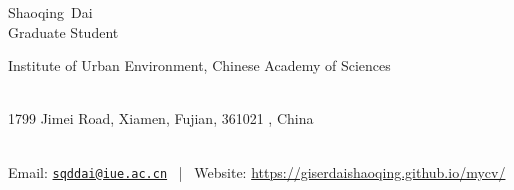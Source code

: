 \documentclass[11pt, a4paper]{article}
\makeatletter
\newcommand{\FirstName}{Shaoqing}
\newcommand{\LastName}{Dai}
\newcommand{\MyName}{\FirstName\ \LastName}
\newcommand{\MyRole}{Graduate Student}
\newcommand{\Email}{sqddai@iue.ac.cn}
\newcommand{\Website}{https://giserdaishaoqing.github.io/mycv/}
\newcommand{\Affiliation}{
    Institute of Urban Environment,
    Chinese Academy of Sciences
}
\newcommand{\Address}{
    1799 Jimei Road, Xiamen, Fujian, 361021 , China
}
\newcommand{\makefield}[2]{\makebox[1.5em]{\color{MarkerColour!80!black}#1} #2}
\makeatother
\begin{document}
\thispagestyle{empty}

\begin{center}
    {\fontsize{36pt}{0}\selectfont \MyName}
    \\[0.5cm]
    {\fontsize{16pt}{0}\selectfont \MyRole}
    \\[0.3cm]
    {\fontsize{10pt}{0}\selectfont
        \Affiliation
        \\[0.2cm]
        \Address
        \\[0.08cm]
        Email: \href{mailto:\Email}{\texttt{\Email}}
        \, | \,
        Website: \url{\Website}
    }
\end{center}












%
%
\end{document}
